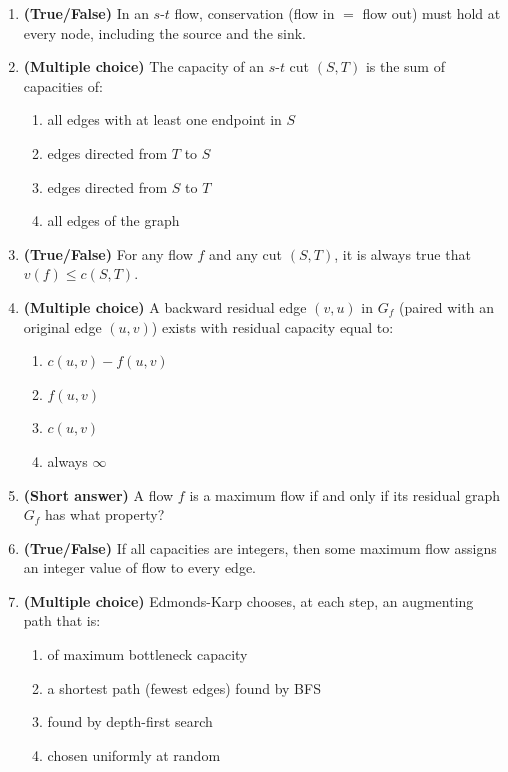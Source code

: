 \documentclass[11pt]{article}
\begin{document}
\begin{enumerate}[label=\textbf{B\arabic*.}, leftmargin=2.2em]

\item \textbf{(True/False)} In an $s$-$t$ flow, conservation (flow in $=$ flow out) must
hold at every node, including the source and the sink.

\item \textbf{(Multiple choice)} The capacity of an $s$-$t$ cut $(S,T)$ is the sum of
capacities of:
\begin{enumerate}[label=(\alph*)]
    \item all edges with at least one endpoint in $S$
    \item edges directed from $T$ to $S$
    \item edges directed from $S$ to $T$
    \item all edges of the graph
\end{enumerate}

\item \textbf{(True/False)} For any flow $f$ and any cut $(S,T)$, it is always true that
$v(f) \le c(S,T)$.

\item \textbf{(Multiple choice)} A backward residual edge $(v,u)$ in $G_f$ (paired with an
original edge $(u,v)$) exists with residual capacity equal to:
\begin{enumerate}[label=(\alph*)]
    \item $c(u,v) - f(u,v)$
    \item $f(u,v)$
    \item $c(u,v)$
    \item always $\infty$
\end{enumerate}

\item \textbf{(Short answer)} A flow $f$ is a maximum flow if and only if its residual
graph $G_f$ has what property?

\item \textbf{(True/False)} If all capacities are integers, then some maximum flow assigns
an integer value of flow to every edge.

\item \textbf{(Multiple choice)} Edmonds-Karp chooses, at each step, an augmenting path
that is:
\begin{enumerate}[label=(\alph*)]
    \item of maximum bottleneck capacity
    \item a shortest path (fewest edges) found by BFS
    \item found by depth-first search
    \item chosen uniformly at random
\end{enumerate}


\end{enumerate}
\end{document}

